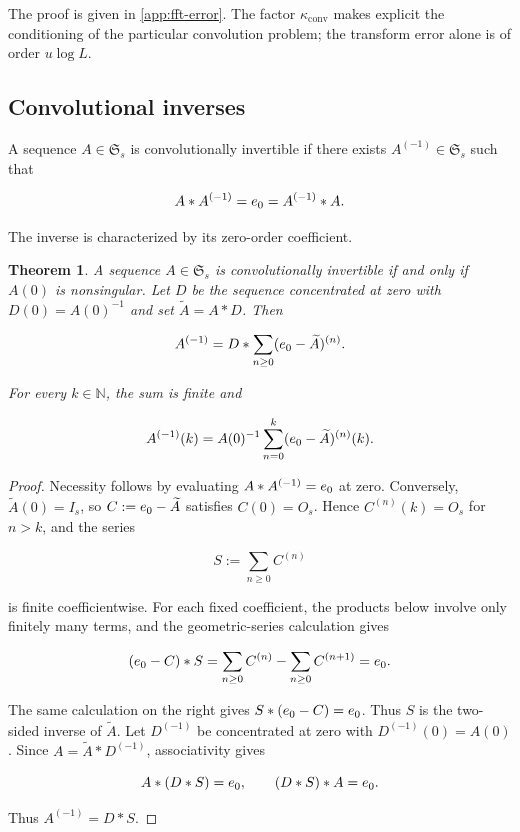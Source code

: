 \documentclass[3p,12pt,authoryear]{elsarticle}
\newtheorem{theorem}{Theorem}[section]
\theoremstyle{definition}
\theoremstyle{remark}
\newcommand{\N}{\mathbb N}
\newcommand{\ez}{e_{\mathstrut 0}}
\begin{document}
The proof is given in \ref{app:fft-error}. The factor $\kappa_{\mathrm{conv}}$ makes explicit the conditioning of the particular convolution problem; the transform error alone is of order $u\log L$.

\subsection{Convolutional inverses}

A sequence $A\in\mathfrak S_s$ is convolutionally invertible if there exists $A^{(-1)}\in\mathfrak S_s$ such that

\begin{equation*}
A*A^{(-1)}=\ez=A^{(-1)}*A.
\end{equation*}


The inverse is characterized by its zero-order coefficient.

\begin{theorem}\label{thm:inverse}
A sequence $A\in\mathfrak S_s$ is convolutionally invertible if and only if $A(0)$ is nonsingular. Let $D$ be the sequence concentrated at zero with $D(0)=A(0)^{-1}$ and set $\widetilde A=A*D$. Then

\begin{equation}\label{eq:inverse-neumann}
A^{(-1)}
=
D*\sum_{n\geq0}(\ez-\widetilde A)^{(n)}.
\end{equation}

For every $k\in\N$, the sum is finite and

\begin{equation}\label{eq:inverse-coefficient}
A^{(-1)}(k)
=
A(0)^{-1}\sum_{n=0}^{k}(\ez-\widetilde A)^{(n)}(k).
\end{equation}

\end{theorem}

\begin{proof}
Necessity follows by evaluating $A*A^{(-1)}=\ez$ at zero. Conversely, $\widetilde A(0)=I_s$, so $C:=\ez-\widetilde A$ satisfies $C(0)=O_s$. Hence $C^{(n)}(k)=O_s$ for $n>k$, and the series

\begin{equation*}
S:=\sum_{n\geq0}C^{(n)}
\end{equation*}

is finite coefficientwise. For each fixed coefficient, the products below involve only finitely many terms, and the geometric-series calculation gives

\begin{equation*}
(\ez-C)*S
=
\sum_{n\geq0}C^{(n)}-\sum_{n\geq0}C^{(n+1)}
=
\ez.
\end{equation*}

The same calculation on the right gives $S*(\ez-C)=\ez$. Thus $S$ is the two-sided inverse of $\widetilde A$. Let $D^{(-1)}$ be concentrated at zero with $D^{(-1)}(0)=A(0)$. Since $A=\widetilde A*D^{(-1)}$, associativity gives

\begin{equation*}
A*(D*S)=\ez,
\qquad
(D*S)*A=\ez.
\end{equation*}

Thus $A^{(-1)}=D*S$.
\end{proof}
\end{document}
